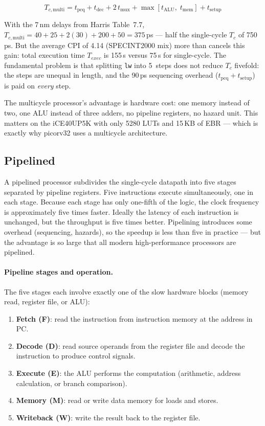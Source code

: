 \documentclass[9pt, a4paper]{extarticle}
\begin{document}
$$
T_{c,\text{multi}} = t_{\text{pcq}} + t_{\text{dec}} + 2\,t_{\text{mux}} + \max\!\left[t_{\text{ALU}},\; t_{\text{mem}}\right] + t_{\text{setup}}
$$

With the 7\,nm delays from Harris Table~7.7, $T_{c,\text{multi}} = 40 + 25 + 2(30) + 200 + 50 = 375$\,ps --- half the single-cycle $T_c$ of 750\,ps. But the average CPI of 4.14 (SPECINT2000 mix) more than cancels this gain: total execution time $T_{exec}$ is 155\,s versus 75\,s for single-cycle. The fundamental problem is that splitting \texttt{lw} into 5~steps does not reduce $T_c$ fivefold: the steps are unequal in length, and the 90\,ps sequencing overhead ($t_{\text{pcq}} + t_{\text{setup}}$) is paid on \emph{every} step.

The multicycle processor's advantage is hardware cost: one memory instead of two, one ALU instead of three adders, no pipeline registers, no hazard unit. This matters on the iCE40UP5K with only 5280 LUTs and 15\,KB of EBR --- which is exactly why picorv32 uses a multicycle architecture.

\subsection{Pipelined}

A pipelined processor subdivides the single-cycle datapath into five stages separated by pipeline registers. Five instructions execute simultaneously, one in each stage. Because each stage has only one-fifth of the logic, the clock frequency is approximately five times faster. Ideally the latency of each instruction is unchanged, but the throughput is five times better. Pipelining introduces some overhead (sequencing, hazards), so the speedup is less than five in practice --- but the advantage is so large that all modern high-performance processors are pipelined.

\paragraph{Pipeline stages and operation.} The five stages each involve exactly one of the slow hardware blocks (memory read, register file, or ALU):

\begin{enumerate}
    \item \textbf{Fetch (F)}: read the instruction from instruction memory at the address in PC.
    \item \textbf{Decode (D)}: read source operands from the register file and decode the instruction to produce control signals.
    \item \textbf{Execute (E)}: the ALU performs the computation (arithmetic, address calculation, or branch comparison).
    \item \textbf{Memory (M)}: read or write data memory for loads and stores.
    \item \textbf{Writeback (W)}: write the result back to the register file.
\end{enumerate}
\end{document}
